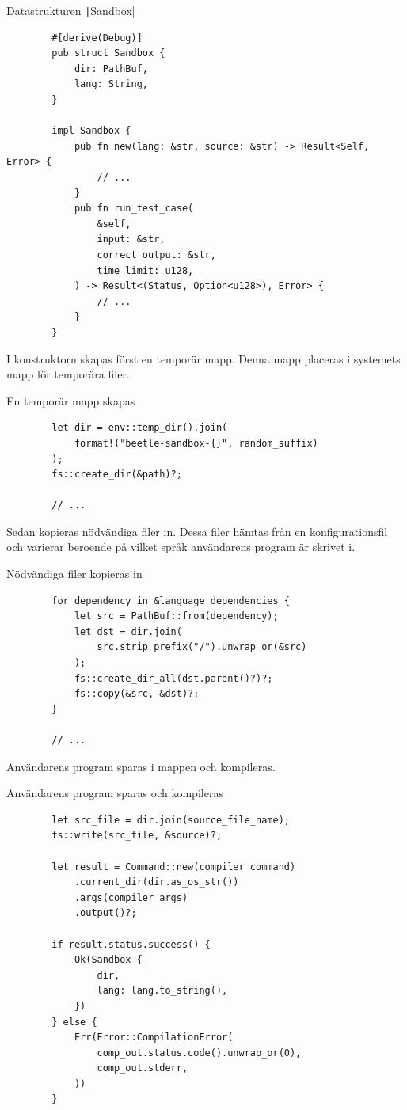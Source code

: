 \documentclass{article}
\begin{document}
\begin{listing}[H]
	\caption{Datastrukturen \texttt|Sandbox|}
	\begin{verbatim}
		#[derive(Debug)]
		pub struct Sandbox {
			dir: PathBuf,
			lang: String,
		}

		impl Sandbox {
			pub fn new(lang: &str, source: &str) -> Result<Self, Error> {
				// ...
			}
			pub fn run_test_case(
				&self,
				input: &str,
				correct_output: &str,
				time_limit: u128,
			) -> Result<(Status, Option<u128>), Error> {
				// ...
			}
		}
	\end{verbatim}
\end{listing}

I konstruktorn skapas först en temporär mapp. Denna mapp placeras i systemets
mapp för temporära filer.

\begin{listing}[H]
	\caption{En temporär mapp skapas}
	\begin{verbatim}
		let dir = env::temp_dir().join(
			format!("beetle-sandbox-{}", random_suffix)
		);
		fs::create_dir(&path)?;

		// ...
	\end{verbatim}
\end{listing}

Sedan kopieras nödvändiga filer in. Dessa filer hämtas från en
konfigurationsfil och varierar beroende på vilket språk användarens program är
skrivet i.

\begin{listing}[H]
	\caption{Nödvändiga filer kopieras in}
	\begin{verbatim}
		for dependency in &language_dependencies {
			let src = PathBuf::from(dependency);
			let dst = dir.join(
				src.strip_prefix("/").unwrap_or(&src)
			);
			fs::create_dir_all(dst.parent()?)?;
			fs::copy(&src, &dst)?;
		}

		// ...
	\end{verbatim}
\end{listing}

Användarens program sparas i mappen och kompileras.

\begin{listing}[H]
	\caption{Användarens program sparas och kompileras}
	\begin{verbatim}
		let src_file = dir.join(source_file_name);
		fs::write(src_file, &source)?;

		let result = Command::new(compiler_command)
			.current_dir(dir.as_os_str())
			.args(compiler_args)
			.output()?;

		if result.status.success() {
			Ok(Sandbox {
				dir,
				lang: lang.to_string(),
			})
		} else {
			Err(Error::CompilationError(
				comp_out.status.code().unwrap_or(0),
				comp_out.stderr,
			))
		}
	\end{verbatim}
\end{listing}
\end{document}
